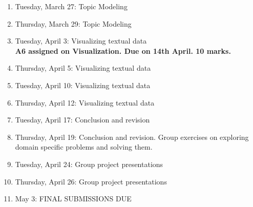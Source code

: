 \documentclass[11pt,a4paper]{article}
\begin{document}
\begin{enumerate}
\item Tuesday, March 27: Topic Modeling 

\item Thursday, March 29: Topic Modeling

\item Tuesday, April 3: Visualizing textual data %
\\ \textbf{A6 assigned on Visualization. Due on 14th April. 10 marks.}

\item Thursday, April 5: Visualizing textual data

\item Tuesday, April 10: Visualizing textual data

\item Thursday, April 12: Visualizing textual data

\item Tuesday, April 17: Conclusion and revision

\item Thursday, April 19: Conclusion and revision. Group exercises on exploring domain specific problems and solving them.

\item Tuesday, April 24: Group project presentations

\item Thursday, April 26: Group project presentations

\item May 3: FINAL SUBMISSIONS DUE

\end{enumerate}
\end{document}

